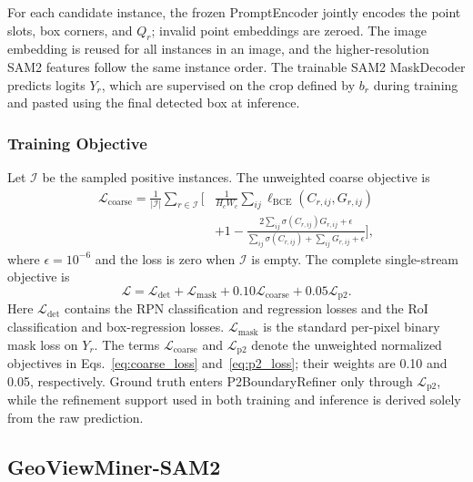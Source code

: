 \documentclass[letterpaper,journal]{IEEEtran}
\begin{document}
For each candidate instance, the frozen PromptEncoder jointly encodes the point slots, box
corners, and $Q_r$; invalid point embeddings are zeroed. The image embedding is reused for all
instances in an image, and the higher-resolution SAM2 features follow the same instance order.
The trainable SAM2 MaskDecoder predicts logits $Y_r$, which are supervised on the crop defined
by $b_r$ during training and pasted using the final detected box at inference.

\subsubsection{Training Objective}

Let $\mathcal{I}$ be the sampled positive instances. The unweighted coarse objective is
\begin{equation}
\begin{aligned}
\mathcal{L}_{\mathrm{coarse}}
=\frac{1}{|\mathcal{I}|}\sum_{r\in\mathcal{I}}\Bigg[
&\frac{1}{H_cW_c}\sum_{ij}\ell_{\mathrm{BCE}}(C_{r,ij},G_{r,ij})\\
&+1-\frac{2\sum_{ij}\sigma(C_{r,ij})G_{r,ij}+\epsilon}
{\sum_{ij}\sigma(C_{r,ij})+\sum_{ij}G_{r,ij}+\epsilon}\Bigg],
\end{aligned}
\label{eq:coarse_loss}
\end{equation}
where $\epsilon=10^{-6}$ and the loss is zero when $\mathcal{I}$ is empty. The complete
single-stream objective is
\begin{equation}
\mathcal{L}=\mathcal{L}_{\mathrm{det}}
+\mathcal{L}_{\mathrm{mask}}
+0.10\mathcal{L}_{\mathrm{coarse}}
+0.05\mathcal{L}_{\mathrm{p2}}.
\label{eq:single_loss}
\end{equation}
Here $\mathcal{L}_{\mathrm{det}}$ contains the RPN classification and regression losses and the
RoI classification and box-regression losses. $\mathcal{L}_{\mathrm{mask}}$ is the standard
per-pixel binary mask loss on $Y_r$. The terms $\mathcal{L}_{\mathrm{coarse}}$ and
$\mathcal{L}_{\mathrm{p2}}$ denote the unweighted normalized objectives in
Eqs.~\eqref{eq:coarse_loss} and~\eqref{eq:p2_loss}; their weights are 0.10 and 0.05,
respectively. Ground truth enters P2BoundaryRefiner only through $\mathcal{L}_{\mathrm{p2}}$,
while the refinement support used in both training and inference is derived solely from the raw
prediction.

\subsection{GeoViewMiner-SAM2}
\label{sec:dual_method}
\end{document}
